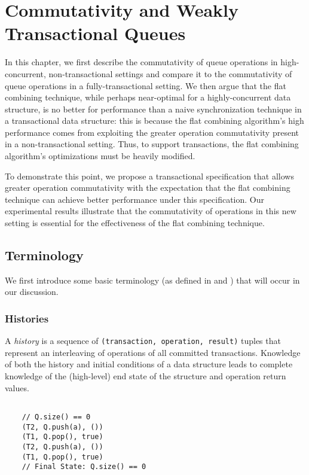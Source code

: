 \chapter{Commutativity and Weakly Transactional Queues}
\label{commutativity}

In this chapter, we first describe the commutativity of queue operations in high-concurrent, non-transactional settings and compare it to the commutativity of queue operations in a fully-transactional setting. We then argue that the flat combining technique, while perhaps near-optimal for a highly-concurrent data structure, is no better for performance than a naive synchronization technique in a transactional data structure: this is because the flat combining algorithm's high performance comes from exploiting the greater operation commutativity present in a non-transactional setting. Thus, to support transactions, the flat combining algorithm's optimizations must be heavily modified. 

To demonstrate this point, we propose a transactional specification that allows greater operation commutativity with the expectation that the flat combining technique can achieve better performance under this specification. Our experimental results illustrate that the commutativity of operations in this new setting is essential for the effectiveness of the flat combining technique.

\section{Terminology}
We first introduce some basic terminology (as defined in \cite{schwarz} and \cite{weihl}) that will occur in our discussion.

\subsection{Histories}
\begin{defn}
    A \emph{history} is a sequence of \texttt{(transaction, operation, result)} tuples that represent an interleaving of operations of all committed transactions. Knowledge of both the history and initial conditions of a data structure leads to complete knowledge of the (high-level) end state of the structure and operation return values.

\begin{eg}
    \begin{lstlisting}
   
    // Q.size() == 0 
    (T2, Q.push(a), ())
    (T1, Q.pop(), true)
    (T2, Q.push(a), ())
    (T1, Q.pop(), true)
    // Final State: Q.size() == 0 
    \end{lstlisting}
\end{eg}

\end{defn}

